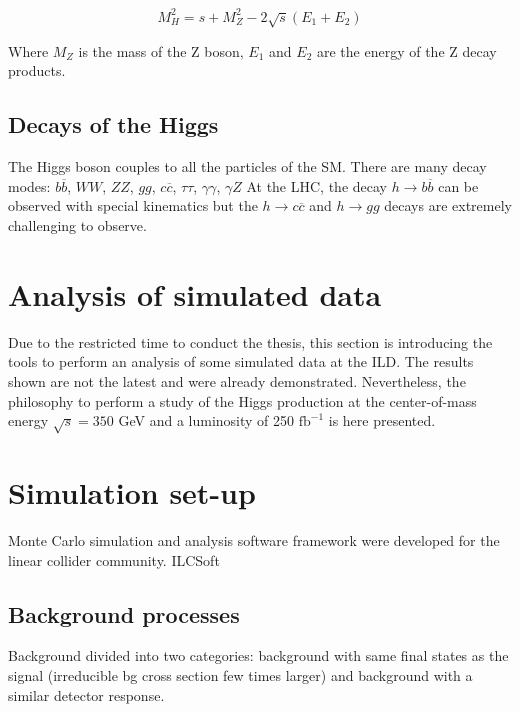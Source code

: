   \begin{equation}
    M^2_H = s + M^2_Z - 2 \sqrt{s}\left(E_{1} + E_{2}\right)
  \end{equation}

  Where $M_Z$ is the mass of the Z boson, $E_1$ and $E_2$ are the energy of the Z decay products. 

  \subsection{Decays of the Higgs}

  The Higgs boson couples to all the particles of the SM.
  There are many decay modes: $b\overline{b}$, $WW$, $ZZ$, $gg$, $c\overline{c}$, $\tau \tau$, $\gamma \gamma$, $\gamma Z$
  At the LHC, the decay $h \rightarrow b\overline{b}$ can be observed with special kinematics but the $h \rightarrow c \overline{c}$ and $h \rightarrow gg$ decays are extremely challenging to observe.

  \section{Analysis of simulated data}
  
    Due to the restricted time to conduct the thesis, this section is introducing the tools to perform an analysis of some simulated data at the ILD. 
    The results shown are not the latest and were already demonstrated. 
    Nevertheless, the philosophy to perform a study of the Higgs production at the center-of-mass energy $\sqrt{s} = 350$ GeV and a luminosity of 250 $\text{fb}^{-1}$ is here presented.
  
  \section{Simulation set-up}  
  
    Monte Carlo simulation and analysis software framework were developed for the linear collider community.
    ILCSoft

  \subsection{Background processes}

   Background divided into two categories: background with same final states as the signal (irreducible bg cross section few times larger) and background with a similar detector response.
   
   \begin{description}
      \item
      \item
      \item
   \end{description}
 
